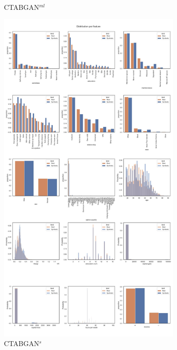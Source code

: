 \begin{landscape}
\begin{figure}[h]
\begin{subfigure}{0.3\linewidth}
			\caption{CTABGAN$^{ml}$}
		\end{subfigure}
		\hfill
		\begin{subfigure}{0.3\linewidth}
			\includegraphics[height=\textheight,width=\linewidth,keepaspectratio]{images/distributions_full/ctabgan_simTune.jpg}
			\caption{CTABGAN$^s$}
		\end{subfigure}	
		\hfill
		\begin{subfigure}{0.3\linewidth}

\end{subfigure}
\end{figure}
\end{landscape}
